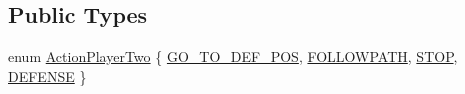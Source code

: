 \subsection*{Public Types}
\begin{DoxyCompactItemize}
\item 
enum \hyperlink{classPlayerTwo_a6dd2b1afb179fe02b677dd71ec5703d2}{ActionPlayerTwo} \{ \hyperlink{classPlayerTwo_a6dd2b1afb179fe02b677dd71ec5703d2a1ee0927d53a79a9c07f3e8347b65ec6e}{GO\_\-TO\_\-DEF\_\-POS}, 
\hyperlink{classPlayerTwo_a6dd2b1afb179fe02b677dd71ec5703d2abd5fef2f14d18f78f33c6e946f1c9cd7}{FOLLOWPATH}, 
\hyperlink{classPlayerTwo_a6dd2b1afb179fe02b677dd71ec5703d2aebb0cbac0bcb8fb7439a980dcc792638}{STOP}, 
\hyperlink{classPlayerTwo_a6dd2b1afb179fe02b677dd71ec5703d2a891b5407c8423ecb7d65df3a7da9b334}{DEFENSE}
 \}
\end{DoxyCompactItemize}
